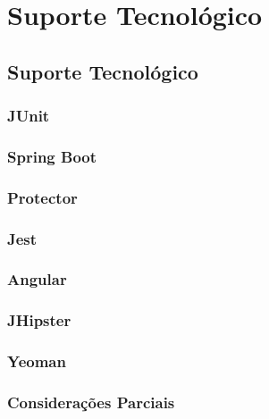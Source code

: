 \part{Suporte Tecnológico}

\chapter[Suporte Tecnologico]{Suporte Tecnológico}

\section{JUnit}

\section{Spring Boot}

\section{Protector}

\section{Jest}

\section{Angular}

\section{JHipster}

\section{Yeoman}

\section{Considerações Parciais}